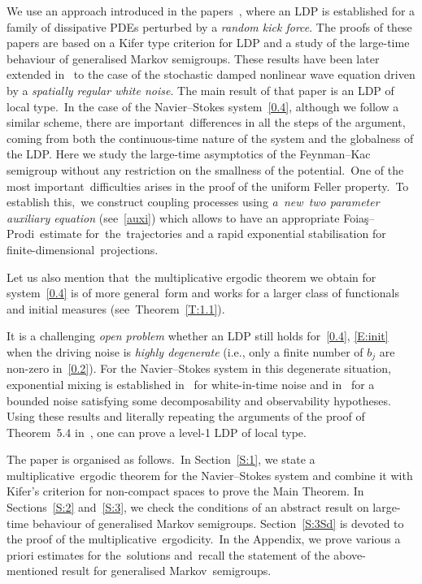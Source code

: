 \documentclass[10pt]{amsart}
\theoremstyle{definition}\newtheorem{defi}[theo]{Definition}\newtheorem{rema}[theo]{Remark}\newtheorem{exam}[theo]{Example}\newtheorem{exem}[theo]{Example}\newtheorem{nota}[theo]{Notation}
\begin{document}
We use an approach introduced in the papers~\cite{JNPS-2012, JNPS-2014}, where an LDP is established for a family of dissipative PDEs perturbed by a \emph{random kick force}. The proofs of these papers are based on a Kifer type criterion for LDP and a study of the large-time behaviour of generalised Markov semigroups. These results have been later extended in~\cite{MN-2015} to the case of the stochastic damped nonlinear wave equation driven by a \emph{spatially regular white noise}. The main result of that paper is an LDP of local type.~In the case of the Navier--Stokes system~\eqref{0.4}, although we follow a similar scheme, there are important~differences in all the steps of the argument, coming from both the continuous-time nature of the system and the globalness of the LDP. Here we study the large-time asymptotics of the Feynman--Kac semigroup without any restriction on the smallness of the potential.~One of the most important~difficulties arises in the proof of the uniform Feller property.~To establish this,~we construct coupling processes using \emph{a~new~two parameter auxiliary equation} (see~\eqref{auxi}) which allows to have an appropriate Foia\c{s}--Prodi~estimate for~the~trajectories and a rapid exponential stabilisation for finite-dimensional~projections.


Let us also mention that~the multiplicative ergodic theorem we obtain for system~\eqref{0.4} is of more general~form and works for a larger class of functionals and initial measures (see~Theorem~\ref{T:1.1}).

It is a challenging \emph{open problem} whether an LDP still holds for~\eqref{0.4}, \eqref{E:init} when the driving noise is \emph{highly degenerate} (i.e., only a finite number of $b_j$ are non-zero in~\eqref{0.2}). For the Navier--Stokes system in this degenerate situation, exponential mixing is established in~\cite{HM-2006} for white-in-time noise and in~\cite{KNS-2018} for a bounded noise satisfying some decomposability and observability hypotheses. Using these results and literally repeating the arguments of the proof of Theorem~5.4 in~\cite{MN-2017}, one can prove a level-1 LDP of local type.

The paper is organised as follows.~In Section~\ref{S:1}, we state a multiplicative~ergodic theorem for the Navier--Stokes system and combine it with Kifer's criterion for non-compact spaces to prove the Main Theorem. In Sections~\ref{S:2} and~\ref{S:3}, we check the conditions of an abstract result on large-time behaviour of generalised Markov semigroups. Section~\ref{S:3Sd} is devoted to the proof of the multiplicative~ergodicity.~In the Appendix, we prove various a priori estimates for the~solutions and~recall the statement of the above-mentioned result for generalised Markov~semigroups.
\end{document}
